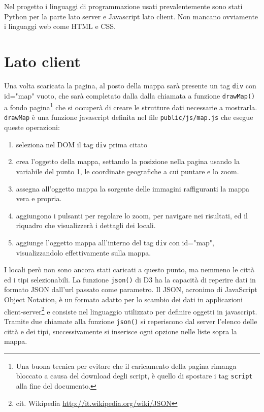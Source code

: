 Nel progetto i linguaggi di programmazione usati prevalentemente sono stati Python per la parte lato server e Javascript lato client. Non mancano ovviamente i linguaggi web come HTML e CSS.

\section{Lato client}
Una volta scaricata la pagina, al posto della mappa sarà presente un tag \texttt{div} con id="map" vuoto, che sarà completato dalla dalla chiamata a funzione \texttt{drawMap()} a fondo pagina\footnote{Una buona tecnica per evitare che il caricamento della pagina rimanga bloccato a causa del download degli script, è quello di spostare i tag \texttt{script} alla fine del documento.} che si occuperà di creare le strutture dati necessarie a mostrarla. 
\texttt{drawMap} è una funzione javascript definita nel file \texttt{public/js/map.js} che esegue queste operazioni:
\begin{enumerate}
\item seleziona nel DOM il tag \texttt{div} prima citato
\item crea l'oggetto della mappa, settando la posizione nella pagina usando la variabile del punto 1, le coordinate geografiche a cui puntare e lo zoom.
\item assegna all'oggetto mappa la sorgente delle immagini raffiguranti la mappa vera e propria.
\item aggiungono i pulsanti per regolare lo zoom, per navigare nei risultati, ed il riquadro che visualizzerà i dettagli dei locali.
\item aggiunge l'oggetto mappa all'interno del tag \texttt{div} con id="map", visualizzandolo effettivamente sulla mappa.
\end{enumerate}

I locali però non sono ancora stati caricati a questo punto, ma nemmeno le città ed i tipi selezionabili. La funzione \texttt{json()} di D3 ha la capacità di reperire dati in formato JSON dall'url passato come parametro. Il JSON, acronimo di JavaScript Object Notation, è un formato adatto per lo scambio dei dati in applicazioni client-server\footnote{cit. Wikipedia \url{http://it.wikipedia.org/wiki/JSON}} e consiste nel linguaggio utilizzato per definire oggetti in javascript. Tramite due chiamate alla funzione \texttt{json()} si reperiscono dal server l'elenco delle città e dei tipi, successivamente si inserisce ogni opzione nelle liste sopra la mappa.

